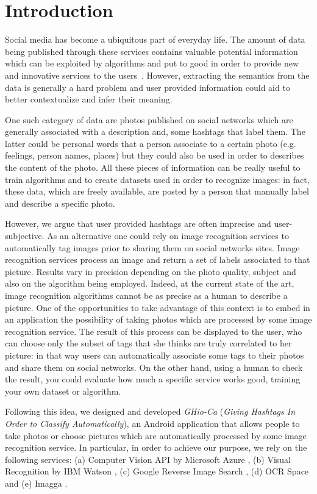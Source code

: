\section{Introduction}
\label{sec:introduction}

Social media has become a ubiquitous part of everyday life. The amount of data being published through these services contains valuable potential information which can be exploited by algorithms and put to good 
in order to provide new and innovative services to the users~\cite{ref1}. However, extracting the semantics from the data is generally a hard problem and user provided information could aid to better contextualize
and infer their meaning.

One such category of data are photos published on social networks which are generally associated with a description and, some hashtags that label them. The latter could be personal words that a person associate 
to a certain photo (e.g. feelings, person names, places) but they could also be used in order to describes the content of the photo. All these pieces of information can be really useful to train algorithms and 
to create datasets used in order to recognize images: in fact, these data, which are freely available, are posted by a person that manually label and describe a specific photo.

However, we argue that user provided hashtags are often imprecise and user-subjective. As an alternative one could rely on image recognition services to automatically tag images prior to sharing them on social networks 
sites. Image recognition services process an image and return a set of labels associated to that picture. Results vary in precision depending on the 
photo quality, subject and also on the algorithm being employed. Indeed, at the current state of the art, image 
recognition algorithms cannot be as precise as a human to describe a picture. One of the opportunities to take advantage of this context is to 
embed in an application the possibility of taking photos which are processed by some image recognition service. The result of this process can be displayed 
to the user, who can choose only the subset of tags that she thinks are truly correlated to her picture: in that way users can automatically associate some 
tags to their photos and share them on social networks. On the other hand, using a human to check the result, you could evaluate how much a specific 
service works good, training your own dataset or algorithm.

Following this idea, we designed and developed \textit{GHio-Ca} (\textit{Giving 
Hashtags In Order to Classify Automatically}), an Android application that allows people to take photos or choose pictures which are automatically 
processed by some image recognition service. In particular, in order to achieve our purpose, we rely on the 
following services: (a) Computer Vision API by Microsoft Azure \cite{Microsoft}
, (b) Visual Recognition by IBM Watson \cite{IBM}, (c) Google Reverse Image 
Search \cite{Google}, (d) OCR Space \cite{OCR} and (e) Imagga \cite{Imagga}.

